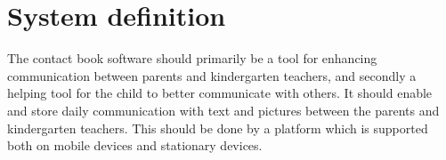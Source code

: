 \section{System definition}
The contact book software should primarily be a tool for enhancing communication between parents and kindergarten teachers, and secondly a helping tool for the child to better communicate with others. It should enable and store daily communication with text and pictures between the parents and kindergarten teachers. This should be done by a platform which is supported both on mobile devices and stationary devices.
\newpage